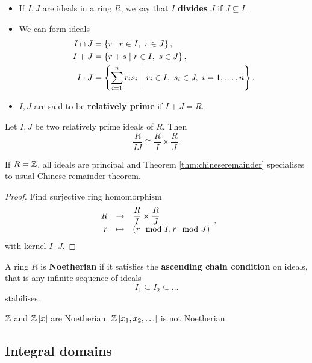 \begin{definition}
\hfill
\begin{itemize}
\item If $ I, J $ are ideals in a ring $ R $, we say that $ I $ \textbf{divides} $ J $ if $ J \subseteq I $.
\item We can form ideals
\begin{align*}
I \cap J & = \left\{ r \mid r \in I, \ r \in J \right\}, \\
I + J & = \left\{ r + s \mid r \in I, \ s \in J \right\}, \\
I \cdot J & = \left\{ \sum_{i = 1}^n r_is_i \ \Bigg| \ r_i \in I, \ s_i \in J, \ i = 1, \dots, n \right\}.
\end{align*}
\item $ I, J $ are said to be \textbf{relatively prime} if $ I + J = R $.
\end{itemize}
\end{definition}

\begin{theorem}
\label{thm:chineseremainder}
Let $ I, J $ be two relatively prime ideals of $ R $. Then
$$ \dfrac{R}{IJ} \cong \dfrac{R}{I} \times \dfrac{R}{J}. $$
\end{theorem}

\begin{remark*}
If $ R = \mathbb{Z} $, all ideals are principal and Theorem \ref{thm:chineseremainder} specialises to usual Chinese remainder theorem.
\end{remark*}

\begin{proof}
Find surjective ring homomorphism
$$ \function{R}{\dfrac{R}{I} \times \dfrac{R}{J}}{r}{\rb{r \mod I, r \mod J}}, $$
with kernel $ I \cdot J $.
\end{proof}

\begin{definition}
A ring $ R $ is \textbf{Noetherian} if it satisfies the \textbf{ascending chain condition} on ideals, that is any infinite sequence of ideals
$$ I_1 \subseteq I_2 \subseteq \dots $$
stabilises.
\end{definition}

\begin{example*}
$ \mathbb{Z} $ and $ \mathbb{Z}\left[ x \right] $ are Noetherian. $ \Z\sb{x_1, x_2, \dots} $ is not Noetherian.
\end{example*}

\pagebreak

\subsection{Integral domains}

